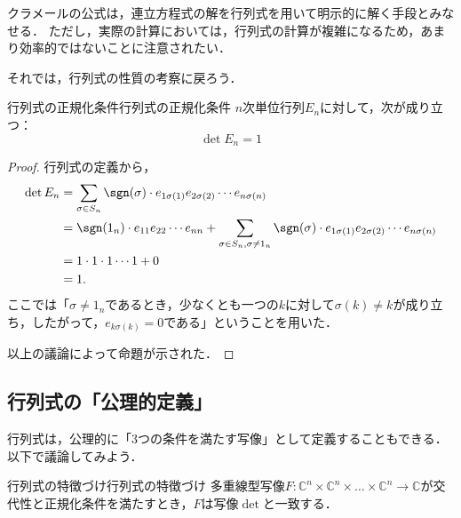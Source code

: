 クラメールの公式は，連立方程式の解を行列式を用いて明示的に解く手段とみなせる．
ただし，実際の計算においては，行列式の計算が複雑になるため，あまり効率的ではないことに注意されたい．

それでは，行列式の性質の考察に戻ろう．

\begin{prop}{行列式の正規化条件}{行列式の正規化条件}
  $n$次単位行列$E_n$に対して，次が成り立つ：
  \[
  \det E_n = 1
  \]
\end{prop}

\begin{tleftbar}
\begin{proof}
  行列式の定義から，
  \begin{align*} 
    \det E_n &= \sum_{\sigma \in S_n} \sgn(\sigma) \cdot e_{1\sigma(1)} e_{2\sigma(2)} \dotsm e_{n\sigma(n)} \\
    &= \sgn(1_n) \cdot e_{11} e_{22} \dotsm e_{nn} + \sum_{\sigma \in S_n, \sigma \ne 1_n} \sgn(\sigma) \cdot e_{1\sigma(1)} e_{2\sigma(2)} \dotsm e_{n\sigma(n)} \\
    &= 1 \cdot 1 \cdot 1 \dotsm 1 + 0 \\
    &= 1.
  \end{align*}
  ここでは「$\sigma \ne 1_n$であるとき，少なくとも一つの$k$に対して$\sigma(k) \ne k$が成り立ち，したがって，$e_{k\sigma(k)} = 0$である」ということを用いた．

  以上の議論によって命題が示された．
\end{proof}
\end{tleftbar}

\subsection{行列式の「公理的定義」}

行列式は，公理的に「3つの条件を満たす写像」として定義することもできる．以下で議論してみよう．

\begin{prop}{行列式の特徴づけ}{行列式の特徴づけ}
多重線型写像$F \colon \mathbb{C}^n \times \mathbb{C}^n \times \dots \times \mathbb{C}^n \to \mathbb{C}$が交代性と正規化条件を満たすとき，$F$は写像$\det$と一致する．
\end{prop}

